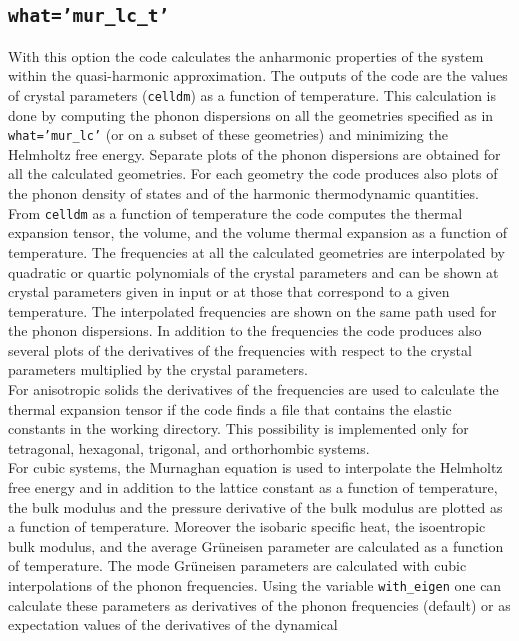 \documentclass[12pt,a4paper]{article}
\begin{document}
\subsection{\color{web-blue}\texttt{what='mur\_lc\_t'}}
With this option the code calculates the anharmonic 
properties of the system within the quasi-harmonic approximation. 
The outputs of the code are the values of crystal parameters 
(\texttt{celldm}) as a function of temperature. This calculation is done 
by computing the phonon dispersions on all the geometries specified as in
\texttt{what='mur\_lc'} (or on a subset of these geometries) and 
minimizing the Helmholtz free energy.
Separate plots of the phonon dispersions are obtained for all the 
calculated geometries.
For each geometry the code produces also plots of the phonon density
of states and of the harmonic thermodynamic quantities.
From \texttt{celldm} as a function of temperature the code computes the thermal
expansion tensor, the volume, and the volume thermal expansion as a 
function of temperature. 
The frequencies at all the calculated geometries are interpolated
by quadratic or quartic polynomials of the crystal parameters
and can be shown at crystal parameters given in input or at those that
correspond to a given temperature. The interpolated frequencies  
are shown on the same path used for the phonon dispersions.
In addition to the frequencies the code produces also several plots of
the derivatives of the frequencies with respect to the crystal parameters
multiplied by the crystal parameters. \\
For anisotropic solids the derivatives of the frequencies are 
used to calculate the thermal expansion tensor if the code finds a
file that contains the elastic constants in the working directory. 
This possibility is implemented only for tetragonal, hexagonal, trigonal, and 
orthorhombic systems. \\
For cubic systems, the Murnaghan equation is used to interpolate the
Helmholtz free energy and in addition to the lattice constant as a function of
temperature, the bulk modulus and the pressure derivative of the bulk modulus 
are plotted as a function of temperature. Moreover the isobaric specific 
heat, the isoentropic 
bulk modulus, and the average Gr\"uneisen parameter are calculated as 
a function of temperature.
The mode Gr\"uneisen parameters are calculated with cubic interpolations of the
phonon frequencies. Using the variable \texttt{with\_eigen} one can 
calculate these parameters as derivatives of the phonon frequencies 
(default) or as expectation values of the derivatives of the dynamical 
\end{document}
